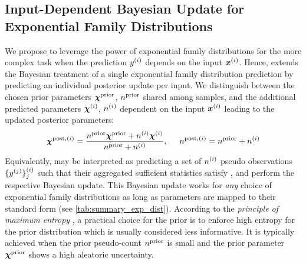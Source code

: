 \subsection{Input-Dependent Bayesian Update for Exponential Family Distributions}
We propose to leverage the power of exponential family distributions for the more complex task when the prediction $y^{(i)}$  depends on the input $\bm{x}^{(i)}$. Hence, \NatPNacro{} extends the Bayesian treatment of a single exponential family distribution prediction by predicting an individual posterior update per input. We distinguish between the chosen prior parameters $\bm{\chi}^\text{prior}$, $n^\text{prior}$ shared among samples, and the additional predicted parameters $\bm{\chi}^{(i)}$, $n^{(i)}$ dependent on the input $\bm{x}^{(i)}$ leading to the updated posterior parameters:
%
\begin{equation}\label{eq:parameter-update}
    \bm{\chi}^{\text{post},(i)} = \frac{n^\text{prior}\bm{\chi}^\text{prior} + n^{(i)} \bm{\chi}^{(i)}}{n^\text{prior} + n^{(i)}}, \hspace{5mm}
    n^{\text{post},(i)} = n^\text{prior} + n^{(i)}
\end{equation}
%
Equivalently, \NatPNacro{} may be interpreted as predicting a set of $n^{(i)}$ pseudo observations $\{y^{(j)}\}_{j}^{(i)}$ such that their aggregated sufficient statistics satisfy , and perform the respective Bayesian update.
%
%
This Bayesian update works for \emph{any} choice of exponential family distributions as long as parameters are mapped to their standard form (see \cref{tab:summary_exp_dist}). According to the \emph{principle of maximum entropy} \citep{maximum-entropy-principle}, a practical choice for the prior is to enforce high entropy for the prior distribution which is usually considered less informative. It is typically achieved when the prior pseudo-count $n^\text{prior}$ is small and the prior parameter $\bm{\chi}^\text{prior}$ shows a high aleatoric uncertainty.

